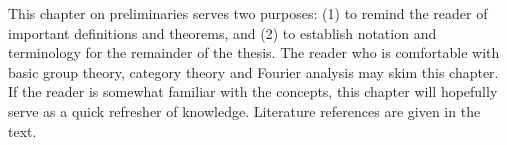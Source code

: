 \label{chap:preliminaries}

This chapter on preliminaries serves two purposes: (1) to remind the reader of important definitions and theorems, and (2) to establish notation and terminology for the remainder of the thesis.
The reader who is comfortable with basic group theory, category theory and Fourier analysis may skim this chapter.
If the reader is somewhat familiar with the concepts, this chapter will hopefully serve as a quick refresher of knowledge.
Literature references are given in the text.

